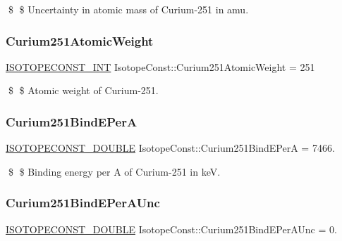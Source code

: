 \$ \$ Uncertainty in atomic mass of Curium-\/251 in amu. \mbox{\label{group___isotope_const-_curium-_cm251_ga1bd8c6e2efe1f78b5f18ba691e324e39}} 
\subsubsection{\texorpdfstring{Curium251\+Atomic\+Weight}{Curium251AtomicWeight}}
{\footnotesize\ttfamily \mbox{\hyperlink{group___isotope_const-_macros_ga5f18360b3e99483a35c32d789e62621c}{I\+S\+O\+T\+O\+P\+E\+C\+O\+N\+S\+T\+\_\+\+I\+NT}} Isotope\+Const\+::\+Curium251\+Atomic\+Weight = 251}

\$ \$ Atomic weight of Curium-\/251. \mbox{\label{group___isotope_const-_curium-_cm251_ga62d0f99bad6a9601ce159b822391cb65}} 
\subsubsection{\texorpdfstring{Curium251\+Bind\+E\+PerA}{Curium251BindEPerA}}
{\footnotesize\ttfamily \mbox{\hyperlink{group___isotope_const-_macros_ga8f45a7272ce02c0b4c65c44636ed719a}{I\+S\+O\+T\+O\+P\+E\+C\+O\+N\+S\+T\+\_\+\+D\+O\+U\+B\+LE}} Isotope\+Const\+::\+Curium251\+Bind\+E\+PerA = 7466.}

\$ \$ Binding energy per A of Curium-\/251 in keV. \mbox{\label{group___isotope_const-_curium-_cm251_ga288848322fc6b44bc917d16bfca29946}} 
\subsubsection{\texorpdfstring{Curium251\+Bind\+E\+Per\+A\+Unc}{Curium251BindEPerAUnc}}
{\footnotesize\ttfamily \mbox{\hyperlink{group___isotope_const-_macros_ga8f45a7272ce02c0b4c65c44636ed719a}{I\+S\+O\+T\+O\+P\+E\+C\+O\+N\+S\+T\+\_\+\+D\+O\+U\+B\+LE}} Isotope\+Const\+::\+Curium251\+Bind\+E\+Per\+A\+Unc = 0.}

